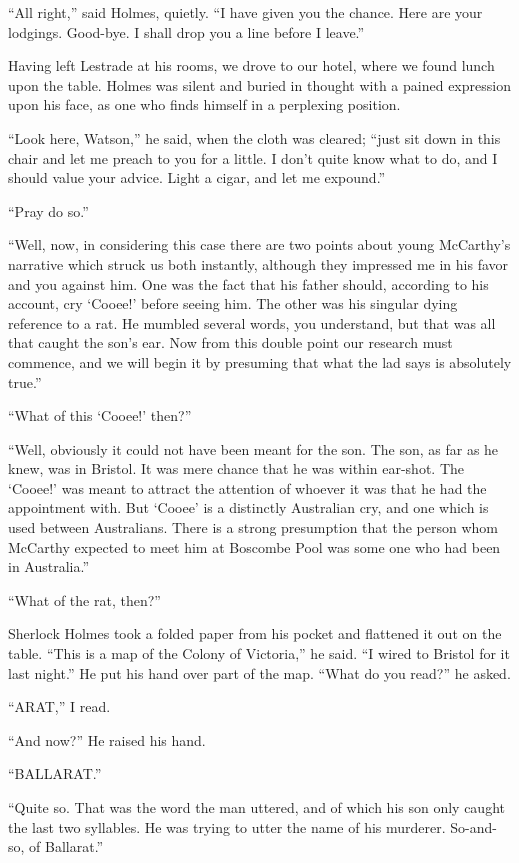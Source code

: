 “All right,” said Holmes, quietly. “I have given you the
chance. Here are your lodgings. Good-bye. I shall drop
you a line before I leave.”

Having left Lestrade at his rooms, we drove to our hotel,
where we found lunch upon the table. Holmes was silent
and buried in thought with a pained expression upon his face,
as one who finds himself in a perplexing position.

“Look here, Watson,” he said, when the cloth was cleared;
“just sit down in this chair and let me preach to you for a
little. I don’t quite know what to do, and I should value your
advice. Light a cigar, and let me expound.”

“Pray do so.”

“Well, now, in considering this case there are two points
about young McCarthy’s narrative which struck us both instantly,
although they impressed me in his favor and you
against him. One was the fact that his father should, according
to his account, cry ‘Cooee!’ before seeing him. The
other was his singular dying reference to a rat. He mumbled
several words, you understand, but that was all that caught
the son’s ear. Now from this double point our research must
commence, and we will begin it by presuming that what the
lad says is absolutely true.”

“What of this ‘Cooee!’ then?”

“Well, obviously it could not have been meant for the son.
The son, as far as he knew, was in Bristol. It was mere
chance that he was within ear-shot. The ‘Cooee!’ was meant
to attract the attention of whoever it was that he had the appointment
with. But ‘Cooee’ is a distinctly Australian cry,
and one which is used between Australians. There is a strong
presumption that the person whom McCarthy expected to
meet him at Boscombe Pool was some one who had been in
Australia.”

“What of the rat, then?”

Sherlock Holmes took a folded paper from his pocket and
flattened it out on the table. “This is a map of the Colony
of Victoria,” he said. “I wired to Bristol for it last night.”
He put his hand over part of the map. “What do you read?”
he asked.

“ARAT,” I read.

“And now?” He raised his hand.

“BALLARAT.”

“Quite so. That was the word the man uttered, and of
which his son only caught the last two syllables. He was trying
to utter the name of his murderer. So-and-so, of Ballarat.”

